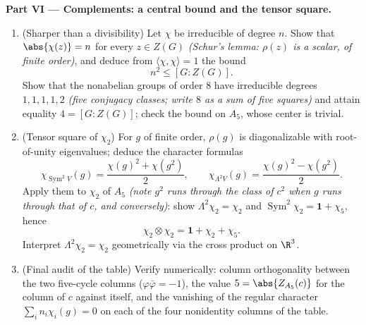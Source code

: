 \begin{problem}
\medskip
\noindent\textbf{Part VI --- Complements: a central bound and
the tensor square.}
\begin{enumerate}[resume]
  \item (Sharper than a divisibility) Let $\chi$ be irreducible
        of degree $n$. Show that $\abs{\chi(z)} = n$ for every
        $z \in Z(G)$ \emph{(Schur's lemma: $\rho(z)$ is a
        scalar, of finite order)}, and deduce from
        $\langle\chi, \chi\rangle = 1$ the bound
        \[
        n^2 \leq [G : Z(G)] .
        \]
        Show that the nonabelian groups of order $8$ have
        irreducible degrees $1, 1, 1, 1, 2$ \emph{(five
        conjugacy classes; write $8$ as a sum of five squares)}
        and attain equality $4 = [G : Z(G)]$; check the bound
        on $A_5$, whose center is trivial.
  \item (Tensor square of $\chi_2$) For $g$ of finite order,
        $\rho(g)$ is diagonalizable with root-of-unity
        eigenvalues; deduce the character formulas
        \[
        \chi_{\operatorname{Sym}^2 V}(g)
        = \frac{\chi(g)^2 + \chi(g^2)}2,
        \qquad
        \chi_{\Lambda^2 V}(g)
        = \frac{\chi(g)^2 - \chi(g^2)}2 .
        \]
        Apply them to $\chi_2$ of $A_5$ \emph{(note $g^2$ runs
        through the class of $c^2$ when $g$ runs through that
        of $c$, and conversely)}: show $\Lambda^2\chi_2 =
        \chi_2$ and $\operatorname{Sym}^2\chi_2 = \mathbf 1 +
        \chi_5$, hence
        \[
        \chi_2\otimes\chi_2 = \mathbf 1 + \chi_2 + \chi_5 .
        \]
        Interpret $\Lambda^2\chi_2 = \chi_2$ geometrically via
        the cross product on $\R^3$.
  \item (Final audit of the table) Verify numerically: column
        orthogonality between the two five-cycle columns
        ($\varphi\bar\varphi = -1$), the value $5 =
        \abs{Z_{A_5}(c)}$ for the column of $c$ against itself,
        and the vanishing of the regular character $\sum_i
        n_i\chi_i(g) = 0$ on each of the four nonidentity
        columns of the table.
\end{enumerate}
\end{problem}
